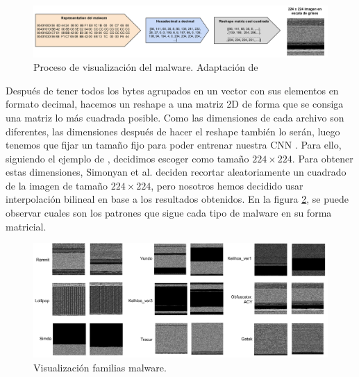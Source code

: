 \begin{figure}[h]
    \begin{center}
    \includegraphics[width=\textwidth]{img/visualMalware.png}
    \end{center}
    \caption{Proceso de visualización del malware. Adaptación de \citep{nataraj2011malware}}
    \label{img: visualMalware}
\end{figure}

Después de tener todos los bytes agrupados en un vector con sus elementos en formato decimal, hacemos un reshape a una matriz 2D de forma que se consiga una matriz lo más cuadrada posible. Como las dimensiones de cada archivo son diferentes, las dimensiones después de hacer el reshape también lo serán, luego tenemos que fijar un tamaño fijo para poder entrenar nuestra CNN \citep{kumar2021mcft}. Para ello, siguiendo el ejemplo de \citep{kalash2018malware}, decidimos escoger como tamaño $224 \times 224$. Para obtener estas dimensiones, Simonyan et al. \citep{simonyan2014very} deciden recortar aleatoriamente un cuadrado de la imagen de tamaño $224 \times 224$, pero nosotros hemos decidido usar interpolación bilineal \citep{he2019malware} en base a los resultados obtenidos. En la figura \ref{img: visualFamilias}, se puede observar cuales son los patrones que sigue cada tipo de malware en su forma matricial.

\begin{figure}[h]
    \begin{center}
    \includegraphics[width=\textwidth]{img/visualFamilias.png}
    \end{center}
    \caption{Visualización familias malware.}
    \label{img: visualFamilias}
\end{figure}


